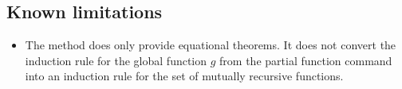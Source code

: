 \documentclass[11pt,a4paper]{article}
\begin{document}
\subsection{Known limitations}
\begin{itemize}
\item The method does only provide equational theorems. It does not convert
  the induction rule for the global function $g$ from the partial function command
  into an induction rule for the set of mutually recursive functions.
\end{itemize}
 





\end{document}
